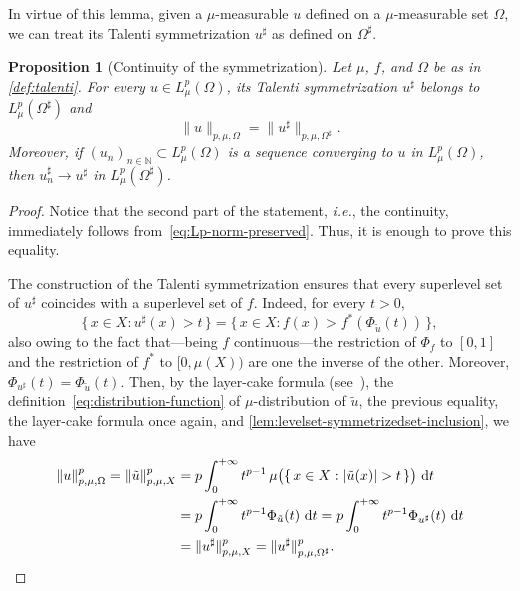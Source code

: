 \documentclass[a4paper,12pt,reqno]{amsart}
\numberwithin{equation}{section}
\newcommand{\di}{\,\mathrm{d}}
\newcommand{\Om}{\Omega}
\theoremstyle{plain}
\newtheorem{proposition}[theorem]{Proposition}
\theoremstyle{definition}
\begin{document}
In virtue of this lemma, given a $\mu$-measurable $u$ defined on a $\mu$-measurable set $\Omega$, we can treat its Talenti symmetrization $u^\sharp$ as defined on $\Omega^\sharp$.

\begin{proposition}[Continuity of the symmetrization]
\label{prop:cnt-sym}
%
Let $\mu$, $f$, and $\Omega$ be as in \cref{def:talenti}. For every $u \in L^p_\mu(\Omega)$, its Talenti symmetrization $u^\sharp$ belongs to $L^p_\mu(\Omega^\sharp)$ and
%
\begin{equation}
\label{eq:Lp-norm-preserved}
\|u\|_{p,\mu,\Omega} = \|u^\sharp\|_{p,\mu,\Omega^\sharp}.
\end{equation}
%
Moreover, if $(u_n)_{n\in\mathbb{N}}\subset L^p_\mu(\Om)$ is a sequence converging to $u$ in $L^p_\mu(\Omega)$, then $u_n^\sharp \to u^\sharp$ in $L^p_\mu(\Omega^\sharp)$.
%
\end{proposition}

\begin{proof}
%
Notice that the second part of the statement, \emph{i.e.}, the continuity, immediately follows from~\eqref{eq:Lp-norm-preserved}. Thus, it is enough to prove this equality.

The construction of the Talenti symmetrization ensures that every superlevel set of $u^\sharp$ coincides with a superlevel set of $f$.  
Indeed, for every $t>0$,
\[
\{\,x\in X:u^\sharp(x)>t\,\}=\{\,x\in X:f(x)>f^*(\Phi_{\tilde{u}}(t))\,\}, 
\]
%
also owing to the fact that---being $f$ continuous---the restriction of $\Phi_f$ to $[0,1]$ and the restriction of $f^*$ to $[0,\mu(X))$ are one the inverse of the other. Moreover, $\Phi_{u^\sharp}(t)=\Phi_{\tilde{u}}(t)$.  Then, by the layer-cake formula (see~\cite[Ex.~1.13]{Mag12book}), the definition~\eqref{eq:distribution-function} of $\mu$-distribution of $\tilde{u}$, the previous equality, the layer-cake formula once again, and \cref{lem:levelset-symmetrizedset-inclusion}, we have
%
\begin{align*}
    \|u\|^p_{p,\mu,\Omega}
    =
    \|\tilde{u}\|^p_{p,\mu,X}
    &= p\int_0^{+\infty} t^{p-1}\,\mu\bigl(\{\,x\in X:|\tilde{u}(x)|>t\,\}\bigr)\,\di t \\
    &= p\int_0^{+\infty} t^{p-1}\Phi_{\tilde{u}}(t)\,\di t
     = p\int_0^{+\infty} t^{p-1}\Phi_{u^\sharp}(t)\,\di t \\
    &= \|u^\sharp\|^p_{p,\mu,X}
    = \|u^\sharp\|^p_{p,\mu,\Omega^\sharp}.
    \qedhere
\end{align*}
%
\end{proof}
\end{document}
